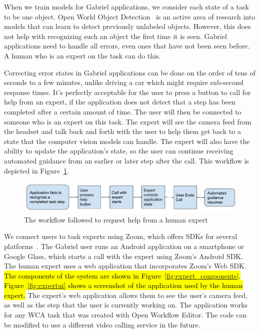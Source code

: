When we train models for Gabriel applications, we consider each state of a task
to be one object. Open World Object Detection~\cite{joseph2021open} is an active
area of research into models that can learn to detect previously unlabeled
objects. However, this does not help with recognizing such an object the first
time it is seen. Gabriel applications need to handle all errors, even ones that
have not been seen before. A human who is an expert on the task can do this.

Correcting error states in Gabriel applications can be done on the order of tens
of seconds to a few
minutes, unlike driving a car which might require sub-second response times.
It's perfectly acceptable for the user to press a button to call for help from
an expert, if the application does not detect that a step has been completed
after a certain amount of time. The user will then be connected to someone who
is an expert on this task. The expert will
see the camera feed from the headset and talk back and forth with the user to
help them get back to a state that the computer vision models can handle.
The expert will also have the ability to update the application's state, so the
user can continue receiving automated guidance from an earlier or later
step after the call.
This workflow is depicted in Figure~\ref{fig:zoom_workflow}.

\begin{figure}[h]
  \includegraphics[width=\textwidth]{figures/zoom_workflow.pdf}
  \caption{
    The workflow followed to request help from a human expert
  }\label{fig:zoom_workflow}
\end{figure}

We connect users to task experts using Zoom, which offers SDKs for several
platforms~\cite{Zoom}. The Gabriel user runs an Android application on a
smartphone or Google Glass, which starts a call with the expert using Zoom's
Android SDK.
The human expert uses a web application that incorporates Zoom's Web SDK.
\hl{
The components of the system are shown in Figure~{\ref{fig:expert_components}}.
Figure~{\ref{fig:expertui}} shows a screenshot of the application used by the
human expert.
}
The expert's web application allows them to see the user's camera feed, as well
as the step that the user is currently working on.
The application works for any WCA task that was created with Open Workflow
Editor.
The code can be modified to use a different video calling service in the future.

